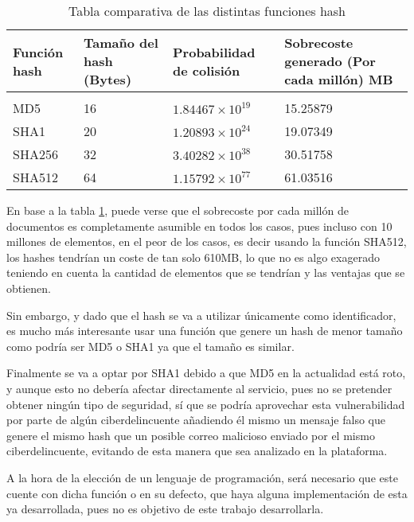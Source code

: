 \begin{table}[t]
    \begin{center}
        \begin{tabular}{| m{1.5cm} || m{2.3cm} | m{3cm} | m{3.8cm} |}
            \hline
            Función hash	& Tamaño del hash (Bytes) & Probabilidad de colisión &	Sobrecoste generado (Por cada millón) MB \\ 
            \hline \hline 
             & & &\\  [0.03cm]
            MD5	    & 16	& \(1.84467\times10^{19}\)	    & 15.25879 \\  [0.3cm]
            SHA1	& 20	& \(1.20893\times10^{24}\)	& 19.07349 \\ [0.3cm]
            SHA256	& 32	& \(3.40282\times10^{38}\)	& 30.51758 \\ [0.3cm]
            SHA512	& 64	& \(1.15792  \times10^{77}	 \)    & 61.03516 \\ [0.3cm]
            \hline
        \end{tabular}
    \caption{Tabla comparativa de las distintas funciones hash}
    \label{table:funciones_hash}
    \end{center}
\end{table}

En base a la tabla \ref{table:funciones_hash}, puede verse que el sobrecoste por cada millón de documentos es completamente asumible en todos los casos, pues incluso con 10 millones de elementos, en el peor de los casos, es decir usando la función SHA512, los hashes tendrían un coste de tan solo 610MB, lo que no es algo exagerado teniendo en cuenta la cantidad de elementos que se tendrían y las ventajas que se obtienen. 

Sin embargo, y dado que el hash se va a utilizar únicamente como identificador, es mucho más interesante usar una función que genere un hash de menor tamaño como podría ser MD5 o SHA1 ya que el tamaño es similar. 

Finalmente se va a optar por SHA1 debido a que MD5 en la actualidad está roto, y aunque esto no debería afectar directamente al servicio, pues no se pretender obtener ningún tipo de seguridad, sí que se podría aprovechar esta vulnerabilidad por parte de algún ciberdelincuente añadiendo él mismo un mensaje falso que genere el mismo hash que un posible correo malicioso enviado por el mismo ciberdelincuente, evitando de esta manera que sea analizado en la plataforma. 

A la hora de la elección de un lenguaje de programación, será necesario que este cuente con dicha función o en su defecto, que haya alguna implementación de esta ya desarrollada, pues no es objetivo de este trabajo desarrollarla.

